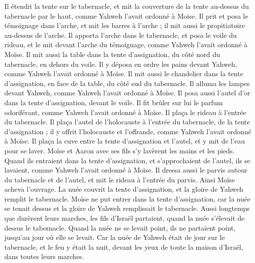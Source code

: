 \begin{multicols}{2}
Il étendit la tente sur le tabernacle, et mit la couverture de la tente au-dessus du tabernacle par le haut, comme Yahweh l'avait ordonné à Moïse.
Il prit et posa le témoignage dans l'arche, et mit les barres à l'arche ; il mit aussi le propitiatoire au-dessus de l'arche.
Il apporta l'arche dans le tabernacle, et posa le voile du rideau, et le mit devant l'arche du témoignage, comme Yahweh l'avait ordonné à Moïse.
Il mit aussi la table dans la tente d'assignation, du côté nord du tabernacle, en dehors du voile.
Il y déposa en ordre les pains devant Yahweh, comme Yahweh l'avait ordonné à Moïse.
Il mit aussi le chandelier dans la tente d'assignation, en face de la table, du côté sud du tabernacle.
Il alluma les lampes devant Yahweh, comme Yahweh l'avait ordonné à Moïse.
Il posa aussi l'autel d'or dans la tente d'assignation, devant le voile.
Il fit brûler sur lui le parfum odoriférant, comme Yahweh l'avait ordonné à Moïse.
Il plaça le rideau à l'entrée du tabernacle.
Il plaça l'autel de l'holocauste à l'entrée du tabernacle, de la tente d'assignation ; il y offrit l'holocauste et l’offrande, comme Yahweh l'avait ordonné à Moïse.
Il plaça la cuve entre la tente d'assignation et l'autel, et y mit de l'eau pour se laver.
Moïse et Aaron avec ses fils s’y lavèrent les mains et les pieds.
Quand ils entraient dans la tente d'assignation, et s’approchaient de l'autel, ils se lavaient, comme Yahweh l'avait ordonné à Moïse.
Il dressa aussi le parvis autour du tabernacle et de l'autel, et mit le rideau à l’entrée du parvis. Ainsi Moïse acheva l'ouvrage.
La nuée couvrit la tente d'assignation, et la gloire de Yahweh remplit le tabernacle.
Moïse ne put entrer dans la tente d'assignation, car la nuée se tenait dessus et la gloire de Yahweh remplissait le tabernacle.
Aussi longtemps que durèrent leurs marches, les fils d’Israël partaient, quand la nuée s’élevait de dessus le tabernacle.
Quand la nuée ne se levait point, ils ne partaient point, jusqu’au jour où elle se levait.
Car la nuée de Yahweh était de jour sur le tabernacle, et le feu y était la nuit, devant les yeux de toute la maison d'Israël, dans toutes leurs marches.
\PPE
\end{multicols}
